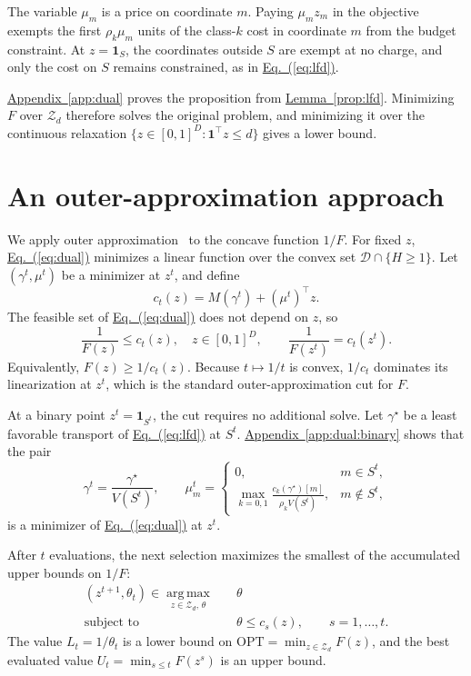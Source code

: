 \documentclass[11pt,a4paper]{article}
\newcommand{\Eqref}[1]{\hyperref[#1]{Eq.~(\ref*{#1})}}
\newcommand{\Appref}[1]{\hyperref[#1]{Appendix~\ref*{#1}}}
\newcommand{\Lemref}[1]{\hyperref[#1]{Lemma~\ref*{#1}}}
\theoremstyle{plain}
\begin{document}
The variable $\mu_m$ is a price on coordinate $m$. Paying $\mu_mz_m$
in the objective exempts the first $\rho_k\mu_m$ units of the class-$k$
cost in coordinate $m$ from the budget constraint. At $z=\mathbf1_S$,
the coordinates outside $S$ are exempt at no charge, and only the cost
on $S$ remains constrained, as in \Eqref{eq:lfd}.

\Appref{app:dual} proves the proposition from \Lemref{prop:lfd}.
Minimizing $F$ over $\mathcal Z_d$ therefore solves the original
problem, and minimizing it over the continuous relaxation
$\{z\in[0,1]^D:\mathbf1^\top z\le d\}$ gives a lower bound.

\section{An outer-approximation approach}\label{sec:algorithm}
We apply outer approximation~\cite{bertsimas2021unified} to the
concave function $1/F$. For fixed $z$, \Eqref{eq:dual} minimizes a
linear function over the convex set $\mathcal D\cap\{H\ge1\}$. Let
$(\gamma^t,\mu^t)$ be a minimizer at $z^t$, and define
\begin{equation}\label{eq:cut}
c_t(z)=M(\gamma^t)+(\mu^t)^\top z.
\end{equation}
The feasible set of \Eqref{eq:dual} does not depend on $z$, so
\[
\frac1{F(z)}\le c_t(z),\quad z\in[0,1]^D,\qquad
\frac1{F(z^t)}=c_t(z^t).
\]
Equivalently, $F(z)\ge1/c_t(z)$. Because $t\mapsto1/t$ is convex,
$1/c_t$ dominates its linearization at $z^t$, which is the standard
outer-approximation cut for $F$.

At a binary point $z^t=\mathbf1_{S^t}$, the cut requires no additional
solve. Let $\gamma^\star$ be a least favorable transport of
\Eqref{eq:lfd} at $S^t$. \Appref{app:dual:binary} shows that the pair
\[
\gamma^t=\frac{\gamma^\star}{V(S^t)},\qquad
\mu^t_m=\begin{cases}
0,&m\in S^t,\\[2pt]
\displaystyle\max_{k=0,1}\frac{c_k(\gamma^\star)[m]}{\rho_kV(S^t)},
&m\notin S^t,
\end{cases}
\]
is a minimizer of \Eqref{eq:dual} at $z^t$.

After $t$ evaluations, the next selection maximizes the smallest of the
accumulated upper bounds on $1/F$:
\begin{equation}\label{eq:master}
\begin{aligned}
(z^{t+1},\theta_t)\in\operatorname*{arg\,max}_{z\in\mathcal Z_d,\,\theta}
\quad&\theta\\
\text{subject to}\quad&\theta\le c_s(z),\qquad s=1,\ldots,t.
\end{aligned}
\end{equation}
The value $L_t=1/\theta_t$ is a lower bound on
$\mathrm{OPT}=\min_{z\in\mathcal Z_d}F(z)$, and the best evaluated
value $U_t=\min_{s\le t}F(z^s)$ is an upper bound.
\end{document}
